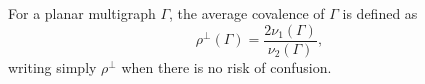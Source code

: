 For a planar multigraph $\Gamma$, the average covalence of $\Gamma$ is defined as
$$\rho^{\perp}(\Gamma) = \frac{2\nu_1(\Gamma)}{\nu_2(\Gamma)},$$
writing simply $\rho^{\perp}$ when there is no risk of confusion.
